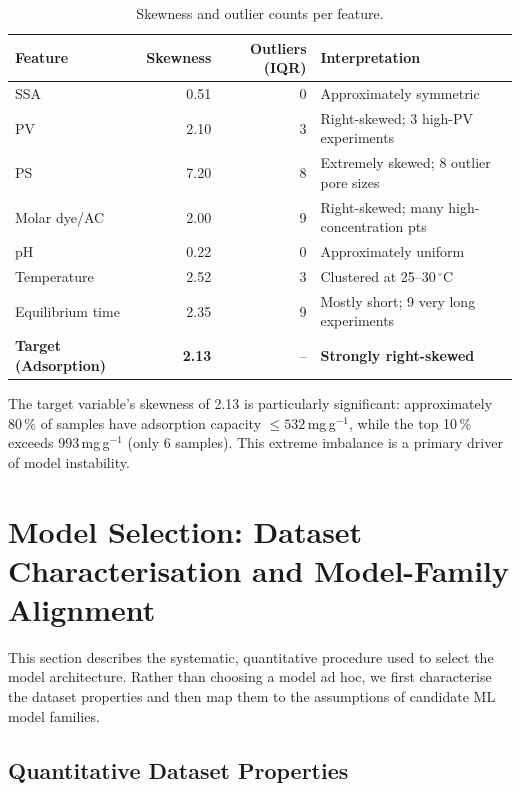 \documentclass[12pt,a4paper]{article}
\begin{document}
\begin{table}[h]
\centering
\caption{Skewness and outlier counts per feature.}
\label{tab:skewness}
\small
\begin{tabular}{lrrl}
\toprule
Feature & Skewness & Outliers (IQR) & Interpretation \\
\midrule
SSA                    & 0.51 & 0 & Approximately symmetric \\
PV                     & 2.10 & 3 & Right-skewed; 3 high-PV experiments \\
PS                     & 7.20 & 8 & Extremely skewed; 8 outlier pore sizes \\
Molar dye/AC           & 2.00 & 9 & Right-skewed; many high-concentration pts \\
pH                     & 0.22 & 0 & Approximately uniform \\
Temperature            & 2.52 & 3 & Clustered at 25--30\,$^\circ$C \\
Equilibrium time       & 2.35 & 9 & Mostly short; 9 very long experiments \\
\textbf{Target (Adsorption)} & \textbf{2.13} & -- & \textbf{Strongly right-skewed} \\
\bottomrule
\end{tabular}
\end{table}

The target variable's skewness of 2.13 is particularly significant:
approximately 80\,\% of samples have adsorption capacity $\leq
532$\,mg\,g$^{-1}$, while the top 10\,\% exceeds 993\,mg\,g$^{-1}$ (only
6 samples).  This extreme imbalance is a primary driver of model
instability.

\section{Model Selection: Dataset Characterisation and Model-Family Alignment}
\label{sec:model_selection}

This section describes the systematic, quantitative procedure used to
select the model architecture.  Rather than choosing a model ad hoc, we
first characterise the dataset properties and then map them to the
assumptions of candidate ML model families.

\subsection{Quantitative Dataset Properties}
\end{document}
